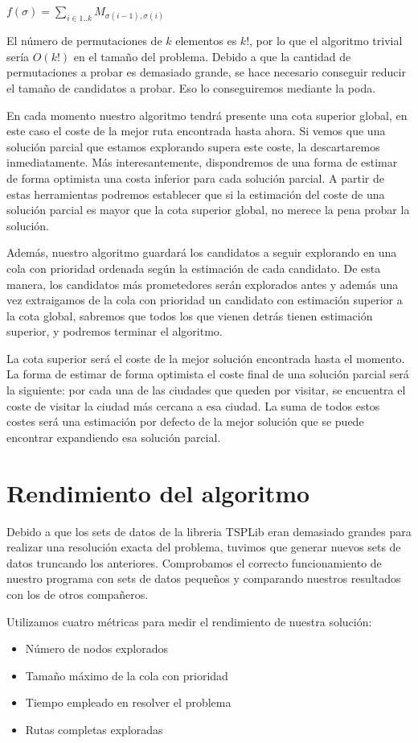 \documentclass[a4paper, 11pt]{article}
\begin{document}
$f(\sigma) = \sum_{i \in 1..k}{M_{\sigma(i - 1), \sigma(i)}}$

El número de permutaciones de $k$ elementos es $k!$, por lo que el algoritmo trivial sería $O(k!)$ en el tamaño del problema. Debido a que la cantidad de permutaciones a probar es demasiado grande, se hace necesario conseguir reducir el tamaño de candidatos a probar. Eso lo conseguiremos mediante la poda.

En cada momento nuestro algoritmo tendrá presente una cota superior global, en este caso el coste de la mejor ruta encontrada hasta ahora. Si vemos que una solución parcial que estamos explorando supera este coste, la descartaremos inmediatamente. Más interesantemente, dispondremos de una forma de estimar de forma optimista una costa inferior para cada solución parcial. A partir de estas herramientas podremos establecer que si la estimación del coste de una solución parcial es mayor que la cota superior global, no merece la pena probar la solución.

Además, nuestro algoritmo guardará los candidatos a seguir explorando en una cola con prioridad ordenada según la estimación de cada candidato. De esta manera, los candidatos más prometedores serán explorados antes y además una vez extraigamos de la cola con prioridad un candidato con estimación superior a la cota global, sabremos que todos los que vienen detrás tienen estimación superior, y podremos terminar el algoritmo.

La cota superior será el coste de la mejor solución encontrada hasta el momento. La forma de estimar de forma optimista el coste final de una solución parcial será la siguiente: por cada una de las ciudades que queden por visitar, se encuentra el coste de visitar la ciudad más cercana a esa ciudad. La suma de todos estos costes será una estimación por defecto de la mejor solución que se puede encontrar expandiendo esa solución parcial.


\section{Rendimiento del algoritmo}
Debido a que los sets de datos de la libreria TSPLib eran demasiado grandes para realizar una resolución exacta del problema, tuvimos que generar nuevos sets de datos truncando los anteriores. Comprobamos el correcto funcionamiento de nuestro programa con sets de datos pequeños y comparando nuestros resultados con los de otros compañeros. 

Utilizamos cuatro métricas para medir el rendimiento de nuestra solución:
\begin{itemize}
  \item Número de nodos explorados
  \item Tamaño máximo de la cola con prioridad
  \item Tiempo empleado en resolver el problema
  \item Rutas completas exploradas
\end{itemize}
\end{document}
